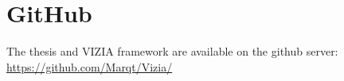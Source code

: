 
\chapter{GitHub}
The thesis and VIZIA framework are available on the github server: \\
\url{https://github.com/Marqt/Vizia/} 

